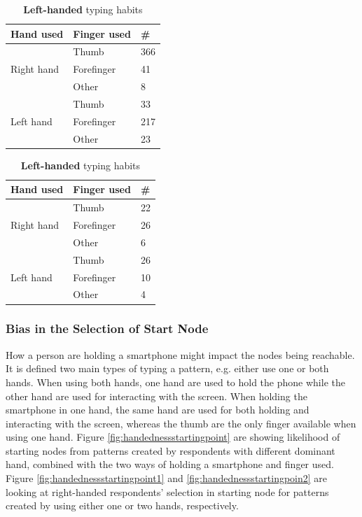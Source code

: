       \begin{table}[H]
        \parbox{.5\linewidth}{
          \centering
          \begin{tabular}{ l | l | l }
            \hline
            {\bf Hand used} & {\bf Finger used} & {\bf \#} \\ \hline
            \multirow{3}{*}{Right hand} & Thumb & 366 \\
            & Forefinger & 41 \\
            & Other & 8 \\ \hline
            \multirow{3}{*}{Left hand} & Thumb & 33 \\
            & Forefinger & 217 \\
            & Other & 23 \\ \hline
          \end{tabular}
          \caption{{\bf Right-handed} typing habits}
          \label{tab:righthandfinger}
        }
        \hfill
        \parbox{.5\linewidth}{
          \centering
          \begin{tabular}{ l | l | l }
            \hline
            {\bf Hand used} & {\bf Finger used} & {\bf \#} \\ \hline
            \multirow{3}{*}{Right hand} & Thumb & 22 \\ 
            & Forefinger & 26 \\
            & Other & 6 \\ \hline
            \multirow{3}{*}{Left hand} & Thumb & 26 \\ 
            & Forefinger & 10 \\
            & Other & 4 \\ \hline
          \end{tabular}
          \caption{{\bf Left-handed} typing habits}
          \label{tab:lefthandfinger}
        }
      \end{table}

    \clearpage
    \subsubsection{Bias in the Selection of Start Node}
    How a person are holding a smartphone might impact the nodes being reachable. It is defined two main types of typing a pattern, e.g. either use one or both hands. When using both hands, one hand are used to hold the phone while the other hand are used for interacting with the screen. When holding the smartphone in one hand, the same hand are used for both holding and interacting with the screen, whereas the thumb are the only finger available when using one hand. Figure \ref{fig:handednessstartingpoint} are showing likelihood of starting nodes from patterns created by respondents with different dominant hand, combined with the two ways of holding a smartphone and finger used. Figure \ref{fig:handednessstartingpoint1} and \ref{fig:handednessstartingpoin2} are looking at right-handed respondents' selection in starting node for patterns created by using either one or two hands, respectively. 

